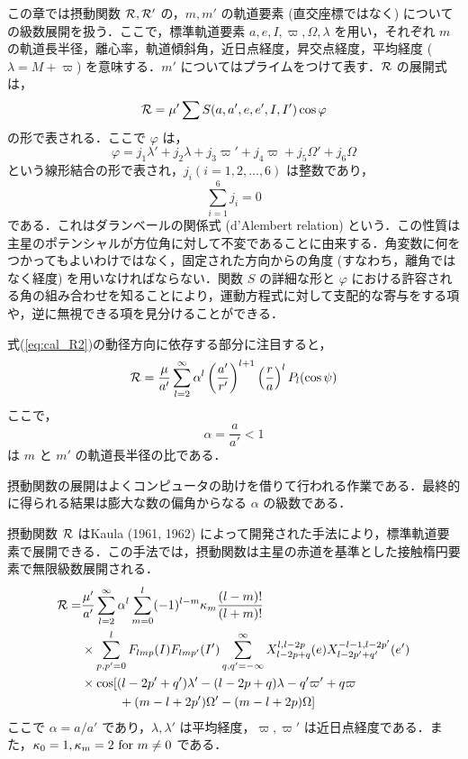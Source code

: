 \documentclass[11pt,a4paper,oneside,onecolumn]{jreport}
\begin{document}
この章では摂動関数 ${\cal R}, {\cal R'}$ の，$m, m'$ の軌道要素 (直交座標ではなく) についての級数展開を扱う．ここで，標準軌道要素 $a, e, I, \varpi, \Omega, \lambda$ を用い，それぞれ $m$ の軌道長半径，離心率，軌道傾斜角，近日点経度，昇交点経度，平均経度 ($\lambda = M + \varpi$) を意味する．$m'$ についてはプライムをつけて表す．${\cal R}$ の展開式は，
\begin{equation}
{\cal R} = \mu' \sum S (a,a',e,e',I,I') \cos \varphi \label{eq:cal_R_varphi}
\end{equation}
の形で表される．ここで $\varphi$ は，
\begin{equation}
\varphi = j_1 \lambda' + j_2 \lambda + j_3 \varpi' + j_4 \varpi + j_5 \Omega' + j_6 \Omega \label{eq:varphi}
\end{equation}
という線形結合の形で表され，$j_i (i = 1,2,…,6)$ は整数であり，
\begin{equation}
\sum_{i = 1}^{6} j_i = 0
\end{equation}
である．これはダランベールの関係式 (d'Alembert relation) という．この性質は主星のポテンシャルが方位角に対して不変であることに由来する．角変数に何をつかってもよいわけではなく，固定された方向からの角度 (すなわち，離角ではなく経度) を用いなければならない．関数 $S$ の詳細な形と $\varphi$ における許容される角の組み合わせを知ることにより，運動方程式に対して支配的な寄与をする項や，逆に無視できる項を見分けることができる．

式(\ref{eq:cal_R2})の動径方向に依存する部分に注目すると，
\begin{equation}
{\cal R} = \frac{\mu}{a'} \sum_{l = 2}^{\infty} \alpha^l \left( \frac{a'}{r'} \right)^{l+1} \left( \frac{r}{a} \right)^l P_l (\cos \psi)
\end{equation}
ここで，
\begin{equation}
\alpha = \frac{a}{a'} < 1
\end{equation}
は $m$ と $m'$ の軌道長半径の比である．

摂動関数の展開はよくコンピュータの助けを借りて行われる作業である．最終的に得られる結果は膨大な数の偏角からなる $\alpha$ の級数である．

摂動関数 ${\cal R}$ はKaula (1961, 1962) によって開発された手法により，標準軌道要素で展開できる．この手法では，摂動関数は主星の赤道を基準とした接触楕円要素で無限級数展開される．
\begin{equation}
\begin{split}
{\cal R} = & \frac{\mu'}{a'} \sum_{l = 2}^{\infty} \alpha^l \sum_{m = 0}^l (-1)^{l - m} \kappa_m \frac{(l - m) !}{(l + m) !} \\
& \times \sum_{p,p' = 0}^l F_{lmp} (I) F_{lmp'} (I') \sum_{q,q' = - \infty}^{\infty} X_{l - 2p + q}^{l, l - 2p} (e) X_{l - 2p' + q'}^{-l -1, l - 2p'} (e') \\
& \times \cos [ (l - 2p' + q') \lambda' - (l - 2p + q) \lambda - q' \varpi' + q \varpi \\
& \quad \quad \quad+ (m - l + 2p') \Omega' - (m - l + 2p) \Omega ]
\end{split}
\end{equation}
ここで $\alpha = a / a'$ であり，$\lambda, \lambda'$ は平均経度，$\varpi, \varpi'$ は近日点経度である．また，$\kappa_0 = 1, \kappa_m = 2 \ {\rm for} \ m \not = 0$ である．
\end{document}
